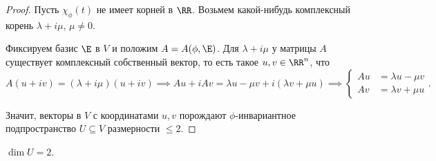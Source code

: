 \documentclass[a4paper]{article}
\begin{document}
\begin{colloq}
\begin{proof}
                Пусть $\chi_\phi(t)$ не имеет корней в $\RR$. Возьмем какой-нибудь комплексный корень $\lambda + i \mu$, $\mu \neq 0$.

                Фиксируем базис $\E$ в $V$ и положим $A = A(\phi, \E)$. Для $\lambda + i \mu$ у матрицы $A$ существует комплексный собственный вектор, то есть такое $u, v \in \RR^n$, что
                \begin{equation*}
                    A(u + iv) = (\lambda + i \mu) (u + i v) \implies Au + iAv = \lambda u - \mu v + i (\lambda v + \mu u) \implies \begin{cases}
                        Au &= \lambda u - \mu v \\
                        Av &= \lambda v + \mu u
                    \end{cases}
                .\end{equation*}
                
                Значит, векторы в $V$ с координатами $u, v$ порождают $\phi$-инвариантное подпространство $U \subseteq V$ размерности $ \leq 2$.
            \end{proof}

            \begin{exercise}
                $\dim U = 2$.
            \end{exercise}

    \end{colloq}
\end{document}
